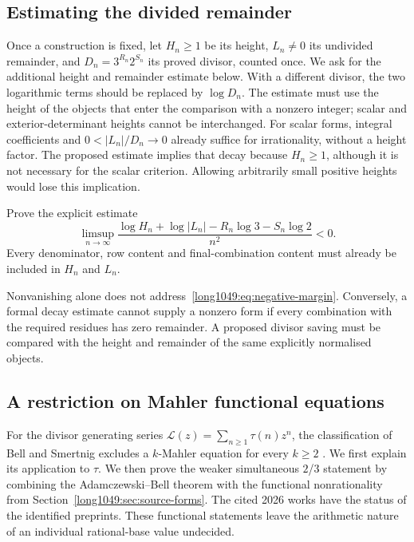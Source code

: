\documentclass[11pt]{article}
\begin{document}
\subsection{Estimating the divided remainder}

Once a construction is fixed, let $H_n\ge1$ be its height, $L_n\ne0$
its undivided remainder, and $D_n=3^{R_n}2^{S_n}$ its proved divisor,
counted once. We ask for the additional height and remainder estimate
below. With a different divisor, the two logarithmic terms should be
replaced by $\log D_n$. The estimate must use the height of the objects
that enter the comparison with a nonzero integer; scalar and
exterior-determinant heights cannot be interchanged.
For scalar forms, integral coefficients and $0<|L_n|/D_n\to0$
already suffice for irrationality, without a height factor. The
proposed estimate implies that decay because $H_n\ge1$, although it
is not necessary for the scalar criterion. Allowing arbitrarily
small positive heights would lose this implication.

\begin{problem}
Prove the explicit estimate
\begin{equation}
 \limsup_{n\to\infty}
 \frac{\log H_n+\log|L_n|-R_n\log3-S_n\log2}{n^2}<0.
\label{long1049:eq:negative-margin}
\end{equation}
Every denominator, row content and final-combination content must already be
included in $H_n$ and $L_n$.
\end{problem}

Nonvanishing alone does not address~\eqref{long1049:eq:negative-margin}.  Conversely,
a formal decay estimate cannot supply a nonzero form if every
combination with the required residues has zero remainder.  A proposed divisor saving must be compared with the height and remainder
of the same explicitly normalised objects.

\subsection{A restriction on Mahler functional equations}

For the divisor generating series
$\mathcal L(z)=\sum_{n\ge1}\tau(n)z^n$, the classification of Bell and
Smertnig excludes a $k$-Mahler equation for every $k\ge2$
\cite[Thm.~1.3 and the consequences on p.~3]{bellsmertnig2026}.
We first explain its application to $\tau$. We then prove the weaker
simultaneous $2$/$3$ statement by combining the Adamczewski--Bell theorem
with the functional nonrationality from
Section~\ref{long1049:sec:source-forms}.
The cited 2026 works have the status of the identified preprints.
These functional statements leave the arithmetic nature of an
individual rational-base value undecided.
\end{document}
